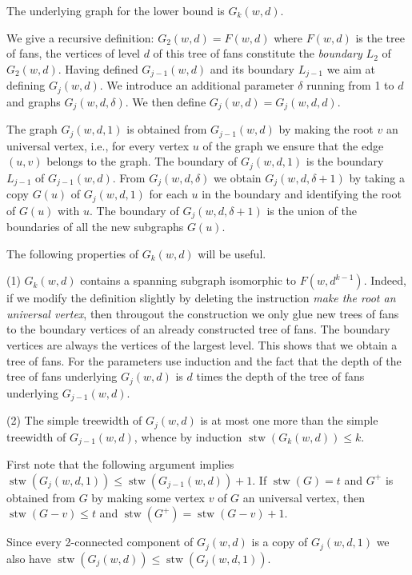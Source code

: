 The underlying graph for the lower bound is $G_k(w,d)$.

We give a recursive definition: $G_2(w,d) = F(w,d)$ where $F(w,d)$ is the tree
of fans, the vertices of level $d$ of this tree of fans constitute the
\emph{boundary} $L_2$ of $G_2(w,d)$.  Having defined $G_{j-1}(w,d)$ and its
boundary $L_{j-1}$ we aim at defining  $G_j(w,d)$.  We introduce an
additional parameter $\delta$ running from 1 to $d$ and graphs
$G_j(w,d,\delta)$. We then define $G_j(w,d)= G_j(w,d,d)$.

The graph $G_j(w,d,1)$ is obtained from $G_{j-1}(w,d)$ by making the root $v$
an universal vertex, i.e., for every vertex $u$ of the graph we ensure that the edge
$(u,v)$ belongs to the graph.  The boundary of $G_j(w,d,1)$ is the boundary
$L_{j-1}$ of $G_{j-1}(w,d)$.  From $G_j(w,d,\delta)$ we obtain
$G_j(w,d,\delta+1)$ by taking a copy $G(u)$ of $G_j(w,d,1)$ for each $u$ in
the boundary and identifying the root of $G(u)$ with $u$. The boundary of
$G_j(w,d,\delta+1)$ is the union of the boundaries of all the new subgraphs
$G(u)$.


The following properties of $G_k(w,d)$ will be useful.

\noindent (1) $G_k(w,d)$ contains a spanning subgraph isomorphic to
$F(w,d^{k-1})$.  Indeed, if we modify the definition slightly by deleting the
instruction \emph{make the root an universal vertex}, then througout the construction we only glue new
trees of fans to the boundary vertices of an already constructed tree of fans.
The boundary vertices are always the vertices of the largest level. This shows
that we obtain a tree of fans. For the parameters use induction and the fact that
the depth of the tree of fans underlying $G_j(w,d)$ is $d$ times
the depth of the tree of fans underlying $G_{j-1}(w,d)$.

\noindent (2) The simple treewidth of $G_j(w,d)$ is at most one more
than the simple treewidth of $G_{j-1}(w,d)$, whence  by induction $\operatorname{stw}(G_k(w,d)) \leq k$.

First note that the following argument implies $\operatorname{stw}(G_j(w,d,1)) \leq \operatorname{stw}(G_{j-1}(w,d))+1$.
If $\operatorname{stw}(G) = t$ and $G^+$ is obtained from $G$ by making some vertex
$v$ of $G$ an universal vertex,
then $\operatorname{stw}(G-v) \leq t$ and $\operatorname{stw}(G^+) = \operatorname{stw}(G-v) + 1$.

Since every 2-connected component of $G_j(w,d)$ is a copy of $G_j(w,d,1)$ we also
have $\operatorname{stw}(G_j(w,d)) \leq \operatorname{stw}(G_j(w,d,1))$.


